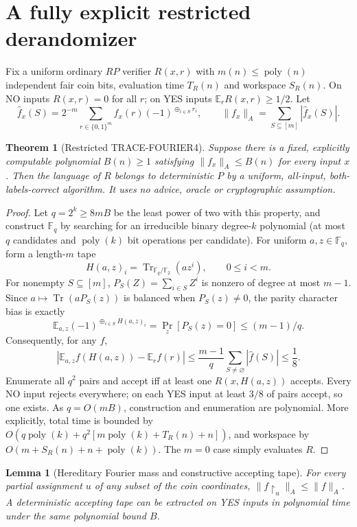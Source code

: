 \documentclass[11pt]{article}
\newtheorem{theorem}{Theorem}
\newtheorem{lemma}{Lemma}
\begin{document}
\section{A fully explicit restricted derandomizer}
Fix a uniform ordinary $RP$ verifier $R(x,r)$ with $m(n)\le\operatorname{poly}(n)$ independent fair coin bits, evaluation time $T_R(n)$ and workspace $S_R(n)$. On NO inputs $R(x,r)=0$ for all $r$; on YES inputs $\mathbb E_r R(x,r)\ge1/2$. Let
\[
\widehat f_x(S)=2^{-m}\sum_{r\in\{0,1\}^m}f_x(r)(-1)^{\oplus_{i\in S}r_i},\qquad
\|f_x\|_A=\sum_{S\subseteq[m]}|\widehat f_x(S)|.
\]
\begin{theorem}[Restricted TRACE-FOURIER4]
Suppose there is a fixed, explicitly computable polynomial $B(n)\ge1$ satisfying $\|f_x\|_A\le B(n)$ for every input $x$. Then the language of $R$ belongs to deterministic $P$ by a uniform, all-input, both-labels-correct algorithm. It uses no advice, oracle or cryptographic assumption.
\end{theorem}
\begin{proof}
Let $q=2^k\ge8mB$ be the least power of two with this property, and construct $\mathbb F_q$ by searching for an irreducible binary degree-$k$ polynomial (at most $q$ candidates and $\operatorname{poly}(k)$ bit operations per candidate). For uniform $a,z\in\mathbb F_q$, form a length-$m$ tape
\[
H(a,z)_i=\operatorname{Tr}_{\mathbb F_q/\mathbb F_2}(az^i),\qquad 0\le i<m.
\]
For nonempty $S\subseteq[m]$, $P_S(Z)=\sum_{i\in S}Z^i$ is nonzero of degree at most $m-1$. Since $a\mapsto\operatorname{Tr}(aP_S(z))$ is balanced when $P_S(z)\ne0$, the parity character bias is exactly
\[
\mathbb E_{a,z}(-1)^{\oplus_{i\in S}H(a,z)_i}=\Pr_z[P_S(z)=0]\le(m-1)/q.
\]
Consequently, for any $f$,
\[
|\mathbb E_{a,z} f(H(a,z))-\mathbb E_{r}f(r)|
\le\frac{m-1}{q}\sum_{S\ne\varnothing}|\widehat f(S)|\le\frac18.
\]
Enumerate all $q^2$ pairs and accept iff at least one $R(x,H(a,z))$ accepts. Every NO input rejects everywhere; on each YES input at least $3/8$ of pairs accept, so one exists. As $q=O(mB)$, construction and enumeration are polynomial. More explicitly, total time is bounded by
$O(q\operatorname{poly}(k)+q^2[m\operatorname{poly}(k)+T_R(n)+n])$,
and workspace by $O(m+S_R(n)+n+\operatorname{poly}(k))$. The $m=0$ case simply evaluates $R$.
\end{proof}
\begin{lemma}[Hereditary Fourier mass and constructive accepting tape]
For every partial assignment $u$ of any subset of the coin coordinates,
$\|f\upharpoonright_u\|_A\le\|f\|_A$. A deterministic accepting tape can be extracted on YES inputs in polynomial time under the same polynomial bound $B$.
\end{lemma}
\end{document}
